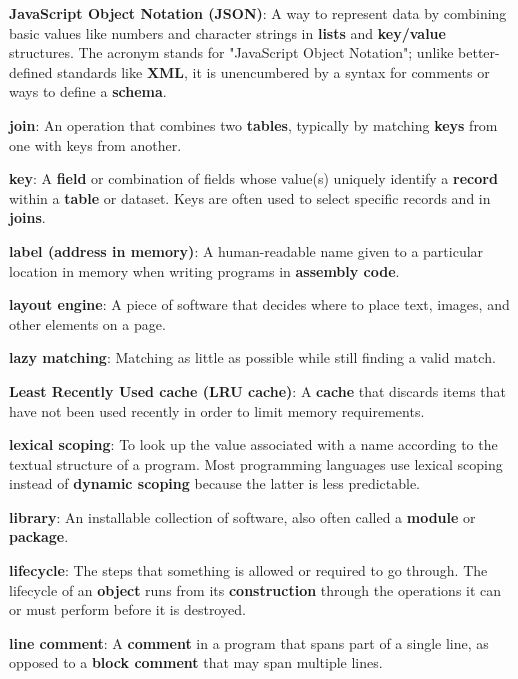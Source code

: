 \documentclass[krantzl]{krantz}
\newcommand{\glosskey}[1]{\textbf{#1}}
\begin{document}
\noindent \textbf{\glosskey{JavaScript Object Notation} (JSON)}: 
A way to represent data by combining basic values like numbers and character strings in \glosskey{lists} and \glosskey{key/value} structures. The acronym stands for "JavaScript Object Notation"; unlike better-defined standards like \glosskey{XML}, it is unencumbered by a syntax for comments or ways to define a \glosskey{schema}.


\noindent \textbf{\glosskey{join}}: 
An operation that combines two \glosskey{tables}, typically by matching \glosskey{keys} from one with keys from another.


\noindent \textbf{\glosskey{key}}: 
A \glosskey{field} or combination of fields whose value(s) uniquely identify a \glosskey{record} within a \glosskey{table} or dataset. Keys are often used to select specific records and in \glosskey{joins}.


\noindent \textbf{\glosskey{label (address in memory)}}: 
A human-readable name given to a particular location in memory when writing programs in \glosskey{assembly code}.


\noindent \textbf{\glosskey{layout engine}}: 
A piece of software that decides where to place text, images, and other elements on a page.


\noindent \textbf{\glosskey{lazy matching}}: 
Matching as little as possible while still finding a valid match.


\noindent \textbf{\glosskey{Least Recently Used cache} (LRU cache)}: 
A \glosskey{cache} that discards items that have not been used recently in order to limit memory requirements.


\noindent \textbf{\glosskey{lexical scoping}}: 
To look up the value associated with a name according to the textual structure of a program. Most programming languages use lexical scoping instead of \glosskey{dynamic scoping} because the latter is less predictable.


\noindent \textbf{\glosskey{library}}: 
An installable collection of software, also often called a \glosskey{module} or \glosskey{package}.


\noindent \textbf{\glosskey{lifecycle}}: 
The steps that something is allowed or required to go through. The lifecycle of an \glosskey{object} runs from its \glosskey{construction} through the operations it can or must perform before it is destroyed.


\noindent \textbf{\glosskey{line comment}}: 
A \glosskey{comment} in a program that spans part of a single line, as opposed to a \glosskey{block comment} that may span multiple lines.
\end{document}
